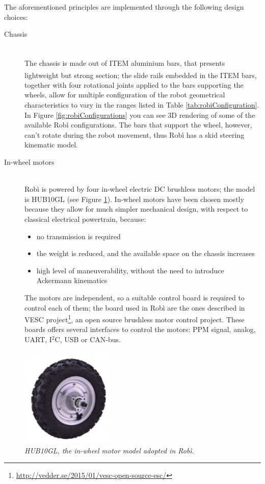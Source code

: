 The aforementioned principles are implemented through the following design choices:
\begin{description}
	\item[Chassis] \hfill \\ The chassis is made out of ITEM\textsuperscript{\textregistered} aluminium bars, that presents lightweight but strong section; the slide rails embedded in the ITEM\textsuperscript{\textregistered} bars, together with four rotational joints applied to the bars supporting the wheels, allow for multiple configuration of the robot geometrical characteristics to vary in the ranges listed in Table \ref{tab:robiConfiguration}. In Figure \ref{fig:robiConfigurations} you can see 3D rendering of some of the available Robì configurations. The bars that support the wheel, however, can't rotate during the robot movement, thus Robì has a skid steering kinematic model.
	
	\item[In-wheel motors] \hfill \\ Robì is powered by four in-wheel electric DC brushless motors; the model is HUB10GL (see Figure \ref{fig:robiMotori}). In-wheel motors have been chosen mostly because they allow for much simpler mechanical design, with respect to classical electrical powertrain, because:
	\begin{itemize}
		\item no transmission is required
		\item the weight is reduced, and the available space on the chassis increases
		\item high level of maneuverability, without the need to introduce Ackermann kinematics
	\end{itemize}
	The motors are independent, so a suitable control board is required to control each of them; the board used in Robì are the ones described in VESC project\footnote{\url{http://vedder.se/2015/01/vesc-open-source-esc/}},
an open source brushless motor control project. These boards offers several interfaces to control the motors:  PPM signal, analog, UART, I$^2$C, USB  or CAN-bus.
\end{description}

\begin{figure}
	\centering
	\includegraphics[width=0.4\textwidth]{Images/robi/motore.png}
	\caption{\textit{HUB10GL, the in-wheel motor model adopted in Robì.}}
	\label{fig:robiMotori}
\end{figure}

